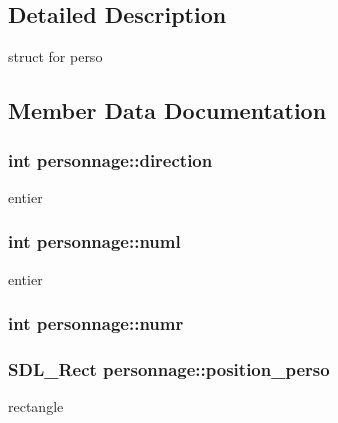 \subsection{Detailed Description}
struct for perso 

\subsection{Member Data Documentation}
\subsubsection[{\texorpdfstring{direction}{direction}}]{\setlength{\rightskip}{0pt plus 5cm}int personnage\+::direction}\hypertarget{structpersonnage_a2664acffa6fccd8487b9e03b63fbd6da}{}\label{structpersonnage_a2664acffa6fccd8487b9e03b63fbd6da}
entier 
\subsubsection[{\texorpdfstring{numl}{numl}}]{\setlength{\rightskip}{0pt plus 5cm}int personnage\+::numl}\hypertarget{structpersonnage_acac339d614a7ac8e987bc94d547d9e18}{}\label{structpersonnage_acac339d614a7ac8e987bc94d547d9e18}
entier 
\subsubsection[{\texorpdfstring{numr}{numr}}]{\setlength{\rightskip}{0pt plus 5cm}int personnage\+::numr}\hypertarget{structpersonnage_a65b13e52d4bab27bc25e35de373fa865}{}\label{structpersonnage_a65b13e52d4bab27bc25e35de373fa865}
\subsubsection[{\texorpdfstring{position\+\_\+perso}{position_perso}}]{\setlength{\rightskip}{0pt plus 5cm}S\+D\+L\+\_\+\+Rect personnage\+::position\+\_\+perso}\hypertarget{structpersonnage_a4a45c9e4310d819fcd3c9a60fc8c0ebf}{}\label{structpersonnage_a4a45c9e4310d819fcd3c9a60fc8c0ebf}
rectangle 
